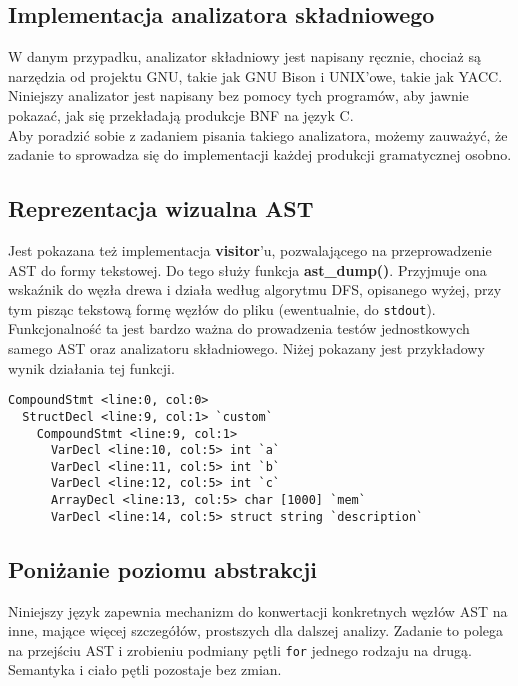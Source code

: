 		\subsection{Implementacja analizatora składniowego}
			
			W danym przypadku, analizator składniowy jest napisany ręcznie, chociaż są narzędzia od
			projektu GNU, takie jak GNU Bison i UNIX'owe, takie jak YACC. Niniejszy analizator
		  	jest napisany bez pomocy tych programów, aby jawnie pokazać, jak się przekładają
		  	produkcje BNF na język C.
		  	\\
		  	
		  	Aby poradzić sobie z zadaniem pisania takiego analizatora, możemy zauważyć, że
		  	zadanie to sprowadza się do implementacji każdej produkcji gramatycznej osobno.
	  	
	  	\subsection{Reprezentacja wizualna AST}
	  		
	  		Jest pokazana też implementacja \textbf{visitor}'u, pozwalającego na przeprowadzenie AST
			do formy tekstowej. Do tego służy funkcja \textbf{ast_dump()}. Przyjmuje ona wskaźnik do
			węzła drewa i działa według algorytmu DFS, opisanego wyżej, przy tym pisząc tekstową formę
			węzłów do pliku (ewentualnie, do \texttt{stdout}). Funkcjonalność ta jest bardzo ważna do
			prowadzenia testów jednostkowych samego AST oraz analizatoru składniowego.
			Niżej pokazany jest przykładowy wynik działania tej funkcji.
			\\
	
\begin{lstlisting}[label={lst:ast-text}]
CompoundStmt <line:0, col:0>
  StructDecl <line:9, col:1> `custom`
	CompoundStmt <line:9, col:1>
	  VarDecl <line:10, col:5> int `a`
	  VarDecl <line:11, col:5> int `b`
	  VarDecl <line:12, col:5> int `c`
	  ArrayDecl <line:13, col:5> char [1000] `mem`
	  VarDecl <line:14, col:5> struct string `description`
\end{lstlisting}
		
		\subsection{Poniżanie poziomu abstrakcji}
			
			Niniejszy język zapewnia mechanizm do konwertacji konkretnych
			węzłów AST na inne, mające więcej szczegółów, prostszych dla
			dalszej analizy. Zadanie to polega na przejściu AST i zrobieniu
			podmiany pętli \texttt{for} jednego rodzaju na drugą. Semantyka i
			ciało pętli pozostaje bez zmian.
			\\

